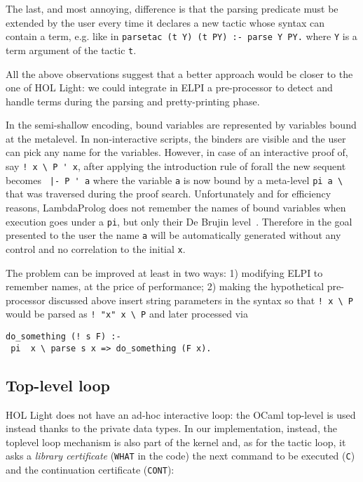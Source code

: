 \documentclass[preprint]{sigplanconf}
\begin{document}
The last, and most annoying, difference is that the parsing predicate must be extended by the user every time it declares a new tactic whose syntax can contain a term, e.g. like in \texttt{parsetac (t Y) (t PY) :- parse Y PY.} where \verb+Y+ is a term argument of the tactic \verb+t+.

All the above observations suggest that a better approach would be closer to the one of HOL Light: we could integrate in ELPI a pre-processor to detect and handle terms during the parsing and pretty-printing phase.

In the semi-shallow encoding, bound variables are represented by variables bound at the metalevel. In non-interactive scripts, the binders are visible and the user can pick any name for the variables. However, in case of an interactive proof of, say \verb+! x \ P ' x+, after applying the introduction rule of forall the new sequent becomes \verb+ |- P ' a+ where the variable \verb+a+ is now bound by a meta-level \verb+pi a \ + that was traversed during the proof search. Unfortunately and for efficiency reasons, LambdaProlog does not remember the names of bound variables when execution goes under a \verb+pi+, but only their De Brujin level~\cite{debrujn1}. Therefore in the goal presented to the user the name \verb+a+ will be automatically generated without any control and no correlation to the initial \verb+x+.

The problem can be improved at least in two ways: 1) modifying ELPI to remember names, at the price of performance; 2) making the hypothetical pre-processor discussed above insert string parameters in the syntax so that \verb+! x \ P+ would be parsed as \verb+! "x" x \ P+ and later processed via
{\small \begin{verbatim}
do_something (! s F) :-
 pi  x \ parse s x => do_something (F x).
\end{verbatim}}

\subsection{Top-level loop}

HOL Light does not have an ad-hoc interactive loop: the OCaml top-level is used instead thanks to the private data types. In our implementation, instead, the toplevel loop mechanism is also part of the kernel and, as for the tactic loop, it asks a \emph{library certificate} (\verb+WHAT+ in the code) the next command to be executed
(\verb+C+) and the continuation certificate (\verb+CONT+):
\end{document}
